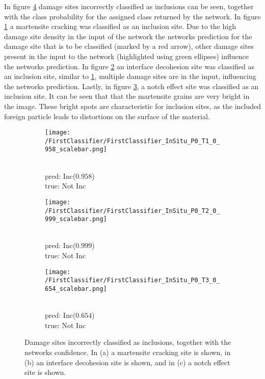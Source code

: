 In figure \ref{fig:FirstClassifierInSituP0T1} damage sites incorrectly classified as inclusions can be seen, together with the class probability for the assigned class returned by the network. In figure \ref{sub:InSituP0T1} a martensite cracking was classified as an inclusion site. Due to the high damage site density in the input of the network the networks prediction for the damage site that is to be classified (marked by a red arrow), other damage sites present in the input to the network (highlighted using green ellipses) influence the networks prediction. In figure \ref{sub:InSituP0T2} an interface decohesion site was classified as an inclusion site, similar to \ref{sub:InSituP0T1}, multiple damage sites are in the input, influencing the networks prediction. Lastly, in figure \ref{sub:InSituP0T3}, a notch effect site was classified as an inclusion site. It can be seen that that the martensite grains are very bright in the image. These bright spots are characteristic for inclusion sites, as the included foreign particle leads to distortions on the surface of the material.

\begin{figure}[H]
\centering
\begin{subfigure}{.3\textwidth}
\texttt{[image: /FirstClassifier/FirstClassifier\_InSitu\_P0\_T1\_0\_958\_scalebar.png]}
\caption{\\pred: Inc($0.958$) \\true: Not Inc}
\label{sub:InSituP0T1}
\end{subfigure}
\centering
\begin{subfigure}{.3\textwidth}
\texttt{[image: /FirstClassifier/FirstClassifier\_InSitu\_P0\_T2\_0\_999\_scalebar.png]}
\caption{\\pred: Inc($0.999$) \\true: Not Inc}
\label{sub:InSituP0T2}
\end{subfigure}
\centering
\begin{subfigure}{.3\textwidth}
\texttt{[image: /FirstClassifier/FirstClassifier\_InSitu\_P0\_T3\_0\_654\_scalebar.png]}
\caption{\\pred: Inc($0.654$) \\true: Not Inc}
\label{sub:InSituP0T3}
\end{subfigure}
\caption{Damage sites incorrectly classified as inclusions, together with the networks confidence. In (a) a martensite cracking site is shown, in (b) an interface decohesion site is shown, and in (c) a notch effect site is shown.}
\label{fig:FirstClassifierInSituP0T1}
\end{figure}

